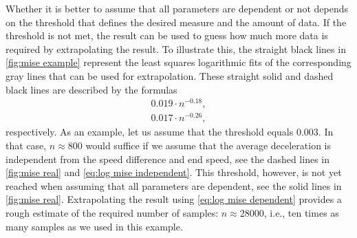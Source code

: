 Whether it is better to assume that all parameters are dependent or not depends on the threshold that defines the desired measure and the amount of data. If the threshold is not met, the result can be used to guess how much more data is required by extrapolating the result. To illustrate this, the straight black lines in \cref{fig:mise example} represent the least squares logarithmic fits of the corresponding gray lines that can be used for extrapolation. These straight solid and dashed black lines are described by the formulas
\begin{align}
	0.019 \cdot n^{-0.18}, \label{eq:log mise dependent} \\
	0.017 \cdot n^{-0.26}, \label{eq:log mise independent}
\end{align}
respectively. As an example, let us assume that the threshold equals $0.003$. In that case, $n \approx 800$ would suffice if we assume that the average deceleration is independent from the speed difference and end speed, see the dashed lines in \cref{fig:mise real} and \cref{eq:log mise independent}. This threshold, however, is not yet reached when assuming that all parameters are dependent, see the solid lines in \cref{fig:mise real}. Extrapolating the result using \cref{eq:log mise dependent} provides a rough estimate of the required number of samples: $n \approx 28000$, i.e., ten times as many samples as we used in this example.

